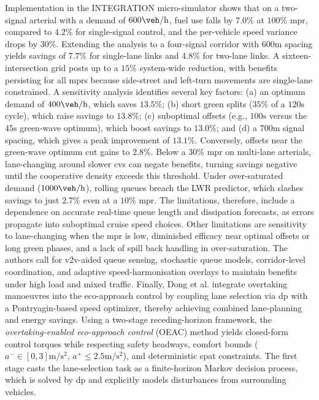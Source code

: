 Implementation in the INTEGRATION micro-simulator shows that on a two-signal arterial with a demand of $600\unit{\veh\per\hour}$, fuel use falls by $7.0\%$ at $100\%$ \ac{mpr}, compared to $4.2\%$ for single-signal control, and the per-vehicle speed variance drops by $30\%$. Extending the analysis to a four-signal corridor with $600\unit{\metre}$ spacing yields savings of $7.7\%$ for single-lane links and $4.8\%$ for two-lane links. A sixteen-intersection grid posts up to a $15\%$ system-wide reduction, with benefits persisting for all \acp{mpr} because side-street and left-turn movements are single-lane constrained. A sensitivity analysis identifies several key factors: (a) an optimum demand of $400\unit{\veh\per\hour}$, which saves $13.5\%$; (b) short green splits ($35\%$ of a $120\unit{\second}$ cycle), which raise savings to $13.8\%$; (c) suboptimal offsets (e.g., $100\unit{\second}$ versus the $45\unit{\second}$ green-wave optimum), which boost savings to $13.0\%$; and (d) a $700\unit{\metre}$ signal spacing, which gives a peak improvement of $13.1\%$. Conversely, offsets near the green-wave optimum cut gains to $2.8\%$. Below a $30\%$ \ac{mpr} on multi-lane arterials, lane-changing around slower \acp{cv} can negate benefits, turning savings negative until the cooperative density exceeds this threshold. Under over-saturated demand ($1000\unit{\veh\per\hour}$), rolling queues breach the LWR predictor, which slashes savings to just $2.7\%$ even at a $10\%$ \ac{mpr}. The limitations, therefore, include a dependence on accurate real-time queue length and dissipation forecasts, as errors propagate into suboptimal cruise speed choices. Other limitations are sensitivity to lane-changing when the \ac{mpr} is low, diminished efficacy near optimal offsets or long green phases, and a lack of spill back handling in over-saturation. The authors call for \ac{v2v}-aided queue sensing, stochastic queue models, corridor-level coordination, and adaptive speed-harmonisation overlays to maintain benefits under high load and mixed traffic.
\mynewline
Finally, Dong et al. \cite{Dong2024} integrate overtaking manoeuvres into the eco-approach control by coupling lane selection via \ac{dp} with a Pontryagin-based speed optimizer, thereby achieving combined lane-planning and energy savings. Using a two-stage receding-horizon framework, the \textit{overtaking-enabled eco-approach control} (OEAC) method yields closed-form control torques while respecting safety headways, comfort bounds ($a^{-}\in[0,3]\unit{\metre\per\second\squared}$, $a^{+}\le2.5\unit{\metre\per\second\squared}$), and deterministic \ac{spat} constraints. The first stage casts the lane-selection task as a finite-horizon Markov decision process, which is solved by \ac{dp} and explicitly models disturbances from surrounding vehicles.
